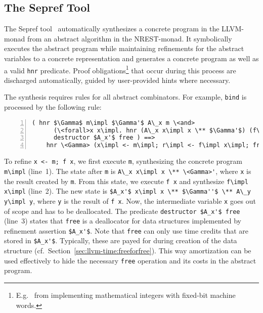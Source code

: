 \documentclass[acmsmall]{acmart}
\newcommand{\is}{\lstinline[language=isabelle]}
\newcommand{\cf}{cf.\xspace}
\begin{document}

\subsection{The Sepref Tool}\label{sec:sepreftool}

\vspace*{-1em}
The Sepref tool~\cite{Lammich15,lammich2019LLVM} automatically synthesizes a concrete program in the LLVM-monad from an abstract algorithm in the NREST-monad. 
It symbolically executes the abstract program while maintaining refinements for the abstract variables to a concrete representation and generates a concrete program as well as a valid \is{hnr} predicate.
Proof obligations\footnote{E.g.\ %
from implementing mathematical integers with fixed-bit machine words.} that occur during this process are discharged automatically, guided by user-provided hints where necessary.

The synthesis requires rules for all abstract combinators. 
For example, \is{bind} is processed by the following rule:
\begin{lstlisting}[numbers=left,xleftmargin=4.0ex]
    ( hnr $\Gamma$ m\impl $\Gamma'$ A\_x m \<and>
      (\<forall>x x\impl. hnr (A\_x x\impl x \** $\Gamma'$) (f\impl x\impl) ($A_x'$ x\impl x \** $\Gamma''$) A\_y (f x)) \<and>
      destructor $A_x'$ free ) ==> 
    hnr \<Gamma> (x\impl <- m\impl; r\impl <- f\impl x\impl; free x\impl; return r\impl) $\Gamma''$ A\_y (x <- m; f x)
\end{lstlisting}
To refine \is{x <- m; f x}, we first execute \is{m}, synthesizing the concrete program \is{m\impl} (line~1).
The state after \is{m} is \is{A\_x x\impl x \** \<Gamma>'}, where \is{x} is the result created by \is{m}.
From this state, we execute \is{f x} and synthesize \is{f\impl x\impl} (line~2). 
The new state is \is{$A_x'$ x\impl x \** $\Gamma''$ \** A\_y y\impl y}, where \is{y} is the result of \is{f x}.
Now, the intermediate variable \is{x} goes out of scope and has to be deallocated.
The predicate \is{destructor $A_x'$ free} (line~3) states that \is{free} is a deallocator for data structures implemented by refinement assertion \is{$A_x'$}.
Note that \is{free} can only use time credits that are stored in \is{$A_x'$}.
Typically, these are payed for during creation of the data structure (\cf\ Section~\ref{sec:llvm-time:freeforfree}).
This way amortization can be used effectively to hide the necessary \is{free} operation and its costs in the abstract program.
\end{document}
